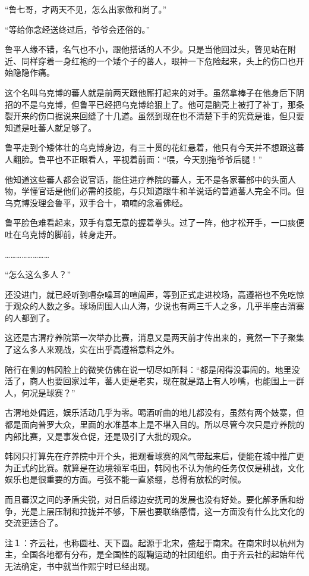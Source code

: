 “鲁七哥，才两天不见，怎么出家做和尚了。”

“等给你念经送终过后，爷爷会还俗的。”

鲁平人缘不错，名气也不小，跟他搭话的人不少。只是当他回过头，瞥见站在附近、同样穿着一身红袍的一个矮个子的蕃人，眼神一下危险起来，头上的伤口也开始隐隐作痛。

这个名叫乌克博的蕃人就是前两天跟他厮打起来的对手。虽然拿棒子在他身后下阴招的不是乌克博，但鲁平已经把乌克博给狠上了。他可是脑壳上被打了补丁，那条裂开来的伤口据说来回缝了十几道。虽然到现在也不清楚下手的究竟是谁，但只要知道是吐蕃人就足够了。

鲁平走到个矮体壮的乌克博身边，有三十贯的花红悬着，他只有今天并不想跟这蕃人翻脸。鲁平也不正眼看人，平视着前面：“喂，今天别拖爷爷后腿！”

他知道这些蕃人都会说官话，能住进疗养院的蕃人，无不是各家蕃部中的头面人物，学懂官话是他们必需的技能，与只知道跟牛和羊说话的普通蕃人完全不同。但乌克博没理会鲁平，双手合十，喃喃的念着佛经。

鲁平脸色难看起来，双手有意无意的握着拳头。过了一阵，他才松开手，一口痰便吐在乌克博的脚前，转身走开。

……………………

“怎么这么多人？”

还没进门，就已经听到嘈杂噪耳的喧闹声，等到正式走进校场，高遵裕也不免吃惊于观众的人数之多。球场周围人山人海，少说也有两三千人之多，几乎半座古渭寨的人都到了。

这还是古渭疗养院第一次举办比赛，消息又是两天前才传出来的，竟然一下子聚集了这么多人来观战，实在出乎高遵裕意料之外。

陪行在侧的韩冈脸上的微笑仿佛在说一切尽如所料：“都是闲得没事闹的。地里没活了，商人也要回家过年，蕃人更是老实，现在就是路上有人吵嘴，也能围上一群人，何况是球赛？”

古渭地处偏远，娱乐活动几乎为零。喝酒听曲的地儿都没有，虽然有两个妓寨，但都是面向普罗大众，里面的水准基本上是不堪入目的。所以尽管今次只是疗养院的内部比赛，又是事发仓促，还是吸引了大批的观众。

韩冈只打算先在疗养院中开个头，把观看球赛的风气带起来后，便能在城中推广更为正式的比赛。就算是在边境领军屯田，韩冈也不认为他的任务仅仅是耕战，文化娱乐也是很重要的方面。弓弦不能一直紧绷，总得有放松的时候。

而且蕃汉之间的矛盾尖锐，对日后缘边安抚司的发展也没有好处。要化解矛盾和纷争，光是上层压制和拉拢并不够，下层也要联络感情，这一方面没有什么比文化的交流更适合了。

注１：齐云社，也称圆社、天下圆。起源于北宋，盛起于南宋。在南宋时以杭州为主，全国各地都有分布，是全国性的蹴鞠运动的社团组织。由于齐云社的起始年代无法确定，书中就当作熙宁时已经出现。

